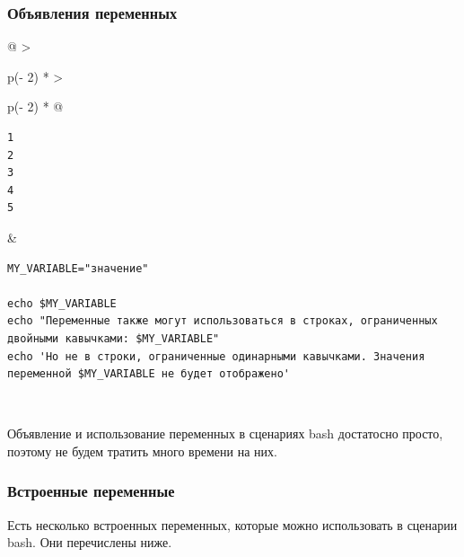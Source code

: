 \documentclass{report}
\begin{document}
\hypertarget{Variable-declarations}{%
\subsubsection{\texorpdfstring{\protect\hyperlink{Variable-declarations}{}Объявления
переменных}{Объявления переменных}}\label{Variable-declarations}}

\begin{longtable}[]{@{}
  >{\raggedright\arraybackslash}p{(\columnwidth - 2\tabcolsep) * }
  >{\raggedright\arraybackslash}p{(\columnwidth - 2\tabcolsep) * }@{}}
\toprule
\endhead
\begin{minipage}[t]{\linewidth}\raggedright
\begin{verbatim}
1
2
3
4
5
\end{verbatim}
\end{minipage} & \begin{minipage}[t]{\linewidth}\raggedright
\begin{verbatim}
MY_VARIABLE="значение"

echo $MY_VARIABLE
echo "Переменные также могут использоваться в строках, ограниченных двойными кавычками: $MY_VARIABLE"
echo 'Но не в строки, ограниченные одинарными кавычками. Значения переменной $MY_VARIABLE не будет отображено'
\end{verbatim}
\end{minipage} \\ \addlinespace
\bottomrule
\end{longtable}

Объявление и использование переменных в сценариях bash достатосно
просто, поэтому не будем тратить много времени на них.

\hypertarget{Built-In-Variables}{%
\subsubsection{\texorpdfstring{\protect\hyperlink{Built-In-Variables}{}Встроенные
переменные}{Встроенные переменные}}\label{Built-In-Variables}}

Есть несколько встроенных переменных, которые можно использовать в
сценарии bash. Они перечислены ниже.
\end{document}
